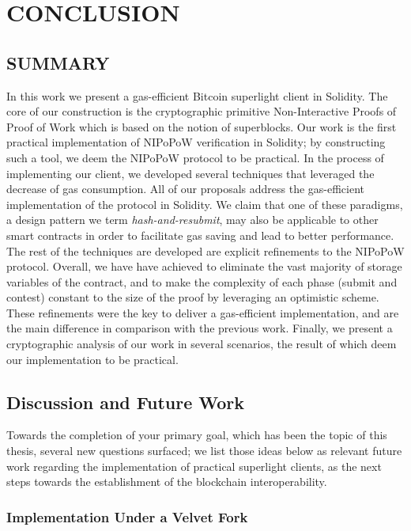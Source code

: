 \chapter{CONCLUSION}

\section{SUMMARY}

In this work we present a gas-efficient Bitcoin superlight client in Solidity.
The core of our construction is the cryptographic primitive Non-Interactive
Proofs of Proof of Work which is based on the notion of superblocks. Our work
is the first practical implementation of NIPoPoW verification in Solidity; by
constructing such a tool, we deem the NIPoPoW protocol to be practical. In the
process of implementing our client, we developed several techniques that
leveraged the decrease of gas consumption. All of our proposals address the
gas-efficient implementation of the protocol in Solidity. We claim that one of
these paradigms, a design pattern we term \emph{hash-and-resubmit}, may also be
applicable to other smart contracts in order to facilitate gas saving and lead
to better performance. The rest of the techniques are developed are explicit
refinements to the NIPoPoW protocol. Overall, we have have achieved to
eliminate the vast majority of storage variables of the contract, and to make
the complexity of each phase (submit and contest) constant to the size of the
proof by leveraging an optimistic scheme. These refinements were the key to
deliver a gas-efficient implementation, and are the main difference in
comparison with the previous work. Finally, we present a cryptographic analysis
of our work in several scenarios, the result of which deem our
implementation to be practical.

\section{Discussion and Future Work}

Towards the completion of your primary goal, which has been the topic of this
thesis, several new questions surfaced; we list those ideas below as relevant
future work regarding the implementation of practical superlight clients, as
the next steps towards the establishment of the blockchain interoperability.

\subsection{Implementation Under a Velvet Fork}

